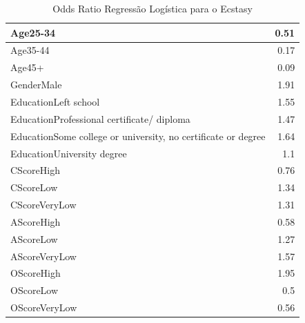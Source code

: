 \documentclass[
	article,			%
	11pt,				%
	oneside,			%
	a4paper,			%
	english,			%
	brazil,				%
	sumario=tradicional
	]{abntex2}
\begin{document}
\begin{table}[H]										
\centering										
\begin{tabular}{|l|r|}										
\hline										
Age25-34	&	0.51	\\	\hline						
Age35-44	&	0.17	\\	\hline						
Age45+	&	0.09	\\	\hline						
GenderMale	&	1.91	\\	\hline						
EducationLeft	school	&	1.55	\\	\hline					
EducationProfessional	certificate/	diploma	&	1.47	\\	\hline				
EducationSome	college	or	university,	no	certificate	or	degree	&	1.64	\\	\hline
EducationUniversity	degree	&	1.1	\\	\hline					
CScoreHigh	&	0.76	\\	\hline						
CScoreLow	&	1.34	\\	\hline						
CScoreVeryLow	&	1.31	\\	\hline						
AScoreHigh	&	0.58	\\	\hline						
AScoreLow	&	1.27	\\	\hline						
AScoreVeryLow	&	1.57	\\	\hline						
OScoreHigh	&	1.95	\\	\hline						
OScoreLow	&	0.5	\\	\hline						
OScoreVeryLow	&	0.56	\\	\hline						
\end{tabular}										
\caption{Odds Ratio	Regressão	Logística	para	o	Ecstasy}				
\label{oddsratio_reglog_ecstasy}										
\end{table}										
\end{document}
